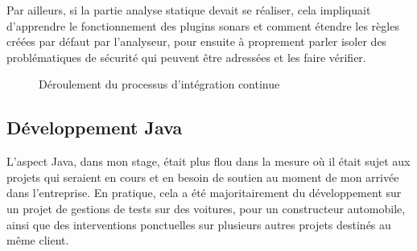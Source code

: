 Par ailleurs, si la partie analyse statique devait se réaliser, cela impliquait d'apprendre le fonctionnement des plugins sonars et comment étendre les règles créées par défaut par l'analyseur, pour ensuite à proprement parler isoler des problématiques de sécurité qui peuvent être adressées et les faire vérifier.

\begin{figure}
	\centering
	\caption{Déroulement du processus d'intégration continue}
	\label{fig:ci_flow}
\end{figure}

\subsection{Développement Java}
L'aspect Java, dans mon stage, était plus flou dans la mesure où il était sujet aux projets qui seraient en cours et en besoin de soutien au moment de mon arrivée dans l'entreprise. En pratique, cela a été majoritairement du développement sur un projet de gestions de tests sur des voitures, pour un constructeur automobile, ainsi que des interventions ponctuelles sur plusieurs autres projets destinés au même client.


